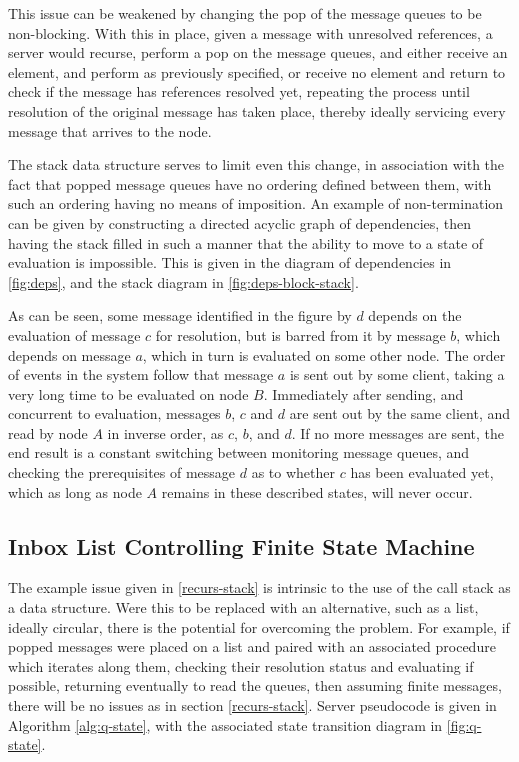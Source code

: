 This issue can be weakened by changing the pop of the message queues to be non-blocking.
With this in place, given a message with unresolved references, a server would recurse, perform a pop on the message queues, and either receive an element, and perform as previously specified, or receive no element and return to check if the message has references resolved yet, repeating the process until resolution of the original message has taken place, thereby ideally servicing every message that arrives to the node.

The stack data structure serves to limit even this change, in association with the fact that popped message queues have no ordering defined between them, with such an ordering having no means of imposition.
An example of non-termination can be given by constructing a directed acyclic graph of dependencies, then having the stack filled in such a manner that the ability to move to a state of evaluation is impossible.
This is given in the diagram of dependencies in \cref{fig:deps}, and the stack diagram in \cref{fig:deps-block-stack}.



As can be seen, some message identified in the figure by \(d\) depends on the evaluation of message \(c\) for resolution, but is barred from it by message \(b\), which depends on message \(a\), which in turn is evaluated on some other node.
The order of events in the system follow that message \(a\) is sent out by some client, taking a very long time to be evaluated on node \(B\).
Immediately after sending, and concurrent to evaluation, messages \(b\), \(c\) and \(d\) are sent out by the same client, and read by node \(A\) in inverse order, as \(c\), \(b\), and \(d\).
If no more messages are sent, the end result is a constant switching between monitoring message queues, and checking the prerequisites of message \(d\) as to whether \(c\) has been evaluated yet, which as long as node \(A\) remains in these described states, will never occur.

\subsection{Inbox List Controlling Finite State Machine}
\label{inbox-list}

The example issue given in \cref{recurs-stack} is intrinsic to the use of the call stack as a data structure.
Were this to be replaced with an alternative, such as a list, ideally circular, there is the potential for overcoming the problem.
For example, if popped messages were placed on a list and paired with an associated procedure which iterates along them, checking their resolution status and evaluating if possible, returning eventually to read the queues, then assuming finite messages, there will be no issues as in section \cref{recurs-stack}.
Server pseudocode is given in Algorithm \ref{alg:q-state}, with the associated state transition diagram in \cref{fig:q-state}.

